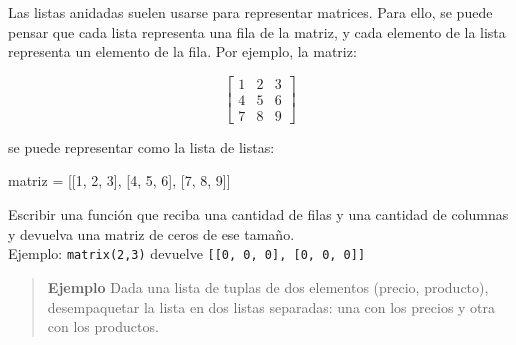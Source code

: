 \documentclass[
  letterpaper,
  DIV=11,
  numbers=noendperiod]{scrreprt}
\newenvironment{Shaded}{\begin{snugshade}}{\end{snugshade}}
\newcommand{\DecValTok}[1]{\textcolor[rgb]{0.68,0.00,0.00}{#1}}
\newcommand{\NormalTok}[1]{\textcolor[rgb]{0.00,0.23,0.31}{#1}}
\newcommand{\OperatorTok}[1]{\textcolor[rgb]{0.37,0.37,0.37}{#1}}
\begin{document}
Las listas anidadas suelen usarse para representar matrices. Para ello,
se puede pensar que cada lista representa una fila de la matriz, y cada
elemento de la lista representa un elemento de la fila. Por ejemplo, la
matriz:

\[
\begin{bmatrix}
1 & 2 & 3 \\
4 & 5 & 6 \\
7 & 8 & 9
\end{bmatrix}
\]

se puede representar como la lista de listas:

\begin{Shaded}
\begin{Highlighting}[]
\NormalTok{matriz }\OperatorTok{=}\NormalTok{ [[}\DecValTok{1}\NormalTok{, }\DecValTok{2}\NormalTok{, }\DecValTok{3}\NormalTok{], [}\DecValTok{4}\NormalTok{, }\DecValTok{5}\NormalTok{, }\DecValTok{6}\NormalTok{], [}\DecValTok{7}\NormalTok{, }\DecValTok{8}\NormalTok{, }\DecValTok{9}\NormalTok{]]}
\end{Highlighting}
\end{Shaded}

\begin{tcolorbox}[enhanced jigsaw, opacitybacktitle=0.6, toptitle=1mm, toprule=.15mm, arc=.35mm, breakable, bottomrule=.15mm, opacityback=0, leftrule=.75mm, rightrule=.15mm, title=\textcolor{quarto-callout-important-color}{\faExclamation}\hspace{0.5em}{Ejercicio Desafío}, left=2mm, bottomtitle=1mm, colframe=quarto-callout-important-color-frame, colback=white, titlerule=0mm, coltitle=black, colbacktitle=quarto-callout-important-color!10!white]

Escribir una función que reciba una cantidad de filas y una cantidad de
columnas y devuelva una matriz de ceros de ese tamaño.\\
Ejemplo: \texttt{matrix(2,3)} devuelve
\texttt{{[}{[}0,\ 0,\ 0{]},\ {[}0,\ 0,\ 0{]}{]}}

\end{tcolorbox}

\hfill\break

\begin{quote}
\textbf{Ejemplo} Dada una lista de tuplas de dos elementos (precio,
producto), desempaquetar la lista en dos listas separadas: una con los
precios y otra con los productos.
\end{quote}
\end{document}
